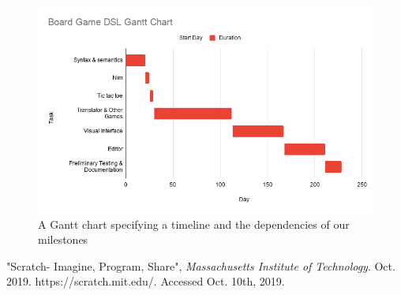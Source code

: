 \documentclass[10pt,letter,draftclsnofoot,onecolumn]{IEEEtran}
\begin{document}
\begin{singlespace}
\begin{figure}[H]
  \centering
  \captionsetup{justification=centering}
    \includegraphics[width=1.0\textwidth,keepaspectratio]{./img/gantt}
    \caption{A Gantt chart specifying a timeline and the dependencies of our milestones}
\end{figure}

%

\begin{thebibliography}{99}
 "Scratch- Imagine, Program, Share", \emph{Massachusetts Institute of Technology}. Oct. 2019. https://scratch.mit.edu/. Accessed Oct. 10th, 2019.
\end{thebibliography}

\end{singlespace}
\end{document}
